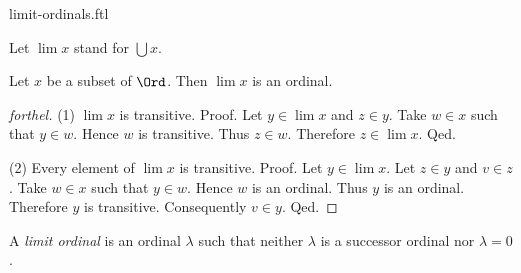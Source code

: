 \documentclass{naproche-library}
\begin{document}
\begin{smodule}[title=Limit Ordinals]{limit-ordinals.ftl}

\begin{convention}[forthel]
  Let $\lim x$ stand for $\bigcup x$.
\end{convention}

\begin{proposition}[forthel,id=SET_THEORY_02_7202164443185152]
  Let $x$ be a subset of $\Ord$.
  Then $\lim x$ is an ordinal.
\end{proposition}
\begin{proof}[forthel]
  (1) $\lim x$ is transitive. \newline
  Proof.
    Let $y \in \lim x$ and $z \in y$.
    Take $w \in x$ such that $y \in w$.
    Hence $w$ is transitive.
    Thus $z \in w$.
    Therefore $z \in \lim x$.
  Qed.

  (2) Every element of $\lim x$ is transitive. \newline
  Proof.
    Let $y \in \lim x$.
    Let $z \in y$ and $v \in z$.
    Take $w \in x$ such that $y \in w$.
    Hence $w$ is an ordinal.
    Thus $y$ is an ordinal.
    Therefore $y$ is transitive.
    Consequently $v \in y$.
  Qed.
\end{proof}

\begin{definition}[forthel,id=SET_THEORY_02_7678388934279168]
  A \emph{limit ordinal} is an ordinal $\lambda$ such that neither $\lambda$ is a successor ordinal nor $\lambda = 0$.
\end{definition}
\end{smodule}
\end{document}
